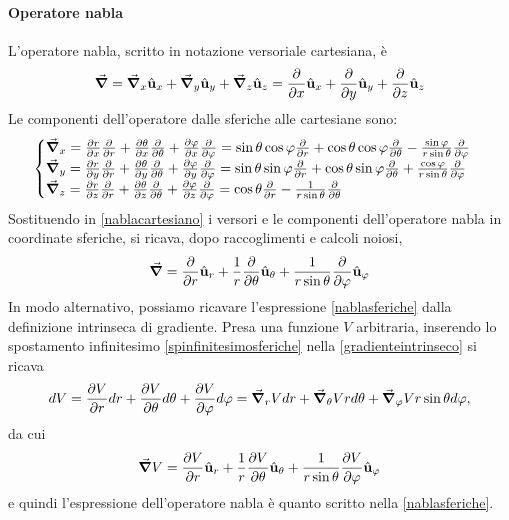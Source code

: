\paragraph{Operatore nabla}
L'operatore nabla, scritto in notazione versoriale cartesiana, è
\begin{equation}
	\grad =\grad_x\hat{\mathbf{u}}_x+\grad_y\hat{\mathbf{u}}_y+\grad_z\hat{\mathbf{u}}_z=\pdv{x}\hat{\mathbf{u}}_x+\pdv{y}\hat{\mathbf{u}}_y+\pdv{z}\hat{\mathbf{u}}_z\label{nablacartesiano}
\end{equation}
Le componenti dell'operatore dalle sferiche alle cartesiane sono:
\begin{equation}
	\begin{cases}
		\grad_x=\pdv{r}{x}\pdv{r}+\pdv{\theta}{x}\pdv{\theta}+\pdv{\varphi}{x}\pdv{\varphi}=\sin\theta\cos\varphi\pdv{r}+\cos\theta\cos\varphi\pdv{\theta}-\frac{\sin\varphi}{r\sin\theta}\pdv{\varphi}\\
		\grad_y=\pdv{r}{y}\pdv{r}+\pdv{\theta}{y}\pdv{\theta}+\pdv{\varphi}{y}\pdv{\varphi}=\sin\theta\sin\varphi\pdv{r}+\cos\theta\sin\varphi\pdv{\theta}+\frac{\cos\varphi}{r\sin\theta}\pdv{\varphi}\\
		\grad_z=\pdv{r}{z}\pdv{r}+\pdv{\theta}{z}\pdv{\theta}+\pdv{\varphi}{z}\pdv{\varphi}=\cos\theta\pdv{r}-\frac{1}{r\sin\theta}\pdv{\theta}\end{cases}
\end{equation}
Sostituendo in \ref{nablacartesiano} i versori e le componenti dell'operatore nabla in coordinate sferiche, si ricava, dopo raccoglimenti e calcoli noiosi,
\begin{equation}
	\grad=\pdv{r}\hat{\mathbf{u}}_r+\frac{1}{r}\pdv{\theta}\hat{\mathbf{u}}_\theta+\frac{1}{r\sin\theta}\pdv{\varphi}\hat{\mathbf{u}}_\varphi\label{nablasferiche}
\end{equation}
In modo alternativo, possiamo ricavare l'espressione \ref{nablasferiche} dalla definizione intrinseca di gradiente. Presa una funzione $V$ arbitraria, inserendo lo spostamento infinitesimo \ref{spinfinitesimosferiche} nella \ref{gradienteintrinseco} si ricava
\begin{equation*}
	dV=\pdv{V}{r}dr+\pdv{V}{\theta}d\theta+\pdv{V}{\varphi}d\varphi=\grad_r{V}dr+\grad_\theta{V}rd\theta+\grad_\varphi{V}r\sin\theta d\varphi,
\end{equation*}
da cui
\begin{equation}
	\grad{V}=\pdv{V}{r}\hat{\mathbf{u}}_r+\frac{1}{r}\pdv{V}{\theta}\hat{\mathbf{u}}_\theta+\frac{1}{r\sin\theta}\pdv{V}{\varphi}\hat{\mathbf{u}}_\varphi
\end{equation}
e quindi l'espressione dell'operatore nabla è quanto scritto nella \ref{nablasferiche}.

